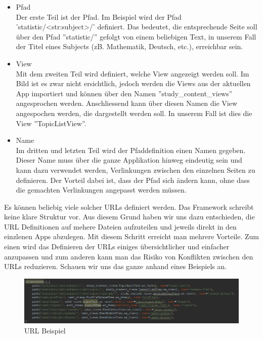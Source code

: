 \begin{itemize}
	\itemsep0em
	\item Pfad \\
	Der erste Teil ist der Pfad. Im Beispiel wird der Pfad 'statistic/<str:subject>/' definiert. Das bedeutet, die entsprechende Seite soll über den Pfad ''statistic/'' gefolgt von einem beliebigen Text, in unserem Fall der Titel eines Subjects (zB. Mathematik, Deutsch, etc.), erreichbar sein. 
	\item View \\
	Mit dem zweiten Teil wird definiert, welche View angezeigt werden soll. Im Bild ist es zwar nicht ersichtlich, jedoch werden die Views aus der aktuellen App importiert und können über den Namen ''study\_content\_views'' angesprochen werden. Anschliessend kann über diesen Namen die View angespochen werden, die dargestellt werden soll. In unserem Fall ist dies die View ''TopicListView''.
	\item Name \\
	Im dritten und letzten Teil wird der Pfaddefinition einen Namen gegeben. Dieser Name muss über die ganze Applikation hinweg eindeutig sein und kann dazu verwendet werden, Verlinkungen zwischen den einzelnen Seiten zu definieren. Der Vorteil dabei ist, dass der Pfad sich ändern kann, ohne dass die gemachten Verlinkungen angepasst werden müssen.
\end{itemize}


Es können beliebig viele solcher URLs definiert werden. Das Framework schreibt keine klare Struktur vor. Aus diesem Grund haben wir uns dazu entschieden, die URL Definitionen auf mehere Dateien aufzuteilen und jeweils direkt in den einzlenen Apps abzulegen. Mit diesem Schritt erreicht man mehrere Vorteile. Zum einen wird das Definieren der URLs einiges übersichtlicher und einfacher anzupassen und zum anderen kann man das Risiko von Konflikten zwischen den URLs reduzieren. Schauen wir uns das ganze anhand eines Beispiels an. \\
\begin{minipage}{\textwidth}
	\begin{figure}[H]
		\includegraphics[width=\textwidth, height=\textheight, keepaspectratio]{images/URLschlecht.png}
		\caption{URL Beispiel}
	\end{figure}
\end{minipage}

